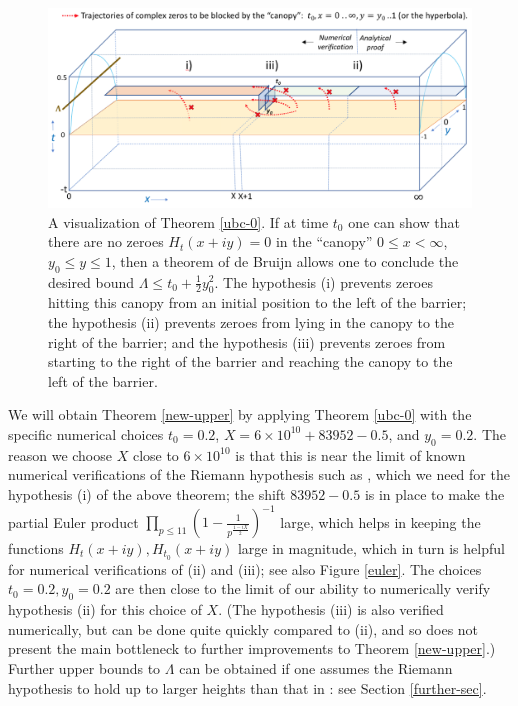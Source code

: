 \documentclass[a4paper,11pt,twoside]{amsart}
\begin{document}
\begin{figure}[ht!]
  \includegraphics[width=0.9\linewidth]{Barrier_approach.png}
  \caption{A visualization of Theorem \ref{ubc-0}.  If at time $t_0$ one can show that there are no zeroes $H_t(x+iy)=0$ in the ``canopy'' $0 \leq x <\infty$, $y_0 \leq y \leq 1$, then a theorem of de Bruijn allows one to conclude the desired bound $\Lambda \leq t_0 + \frac{1}{2} y_0^2$.  The hypothesis (i) prevents zeroes hitting this canopy from an initial position to the left of the barrier; the hypothesis (ii) prevents zeroes from lying in the canopy to the right of the barrier; and the hypothesis (iii) prevents zeroes from starting to the right of the barrier and reaching the canopy to the left of the barrier.}
\label{barrier-fig}
\end{figure}

We will obtain Theorem \ref{new-upper} by applying Theorem \ref{ubc-0} with the specific numerical choices $t_0 = 0.2$, $X = 6 \times 10^{10} + 83952 - 0.5$, and $y_0 = 0.2$.  The reason we choose $X$ close to $6 \times 10^{10}$ is that this is near the limit of known numerical verifications of the Riemann hypothesis such as \cite{platt}, which we need for the hypothesis (i) of the above theorem; the shift $83952 - 0.5$ is in place to make the partial Euler product $\prod_{p \leq 11} \left(1 - \frac{1}{p^{\frac{1-iX}{2}}}\right)^{-1}$ large, which helps in keeping the functions $H_t(x+iy), H_{t_0}(x+iy)$ large in magnitude, which in turn is helpful for numerical verifications of (ii) and (iii); see also Figure \ref{euler}.  The choices $t_0=0.2, y_0=0.2$ are then close to the limit of our ability to numerically verify hypothesis (ii) for this choice of $X$.  (The hypothesis (iii) is also verified numerically, but can be done quite quickly compared to (ii), and so does not present the main bottleneck to further improvements to Theorem \ref{new-upper}.)  Further upper bounds to $\Lambda$ can be obtained if one assumes the Riemann hypothesis to hold up to larger heights than that in \cite{platt}: see Section \ref{further-sec}.
\end{document}
